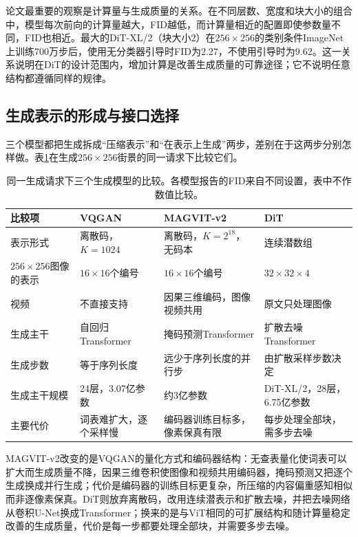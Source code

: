 论文最重要的观察是计算量与生成质量的关系。在不同层数、宽度和块大小的组合中，模型每次前向的计算量越大，FID越低，而计算量相近的配置即使参数量不同，FID也相近。最大的DiT-XL/2（块大小2）在$256\times256$的类别条件ImageNet上训练700万步后，使用无分类器引导时FID为2.27，不使用引导时为9.62。这一关系说明在DiT的设计范围内，增加计算是改善生成质量的可靠途径；它不说明任意结构都遵循同样的规律。

\subsection{生成表示的形成与接口选择}
\label{sec:vision-ivm-generation-interface}

三个模型都把生成拆成“压缩表示”和“在表示上生成”两步，差别在于这两步分别怎样做。表\ref{tab:vision-ivm-generation-models}在生成$256\times256$街景的同一请求下比较它们。

\begin{table}[htbp]
  \centering
  \small
  \begin{tabularx}{\linewidth}{@{}p{16mm}XXX@{}}
    \toprule
    比较项 & VQGAN & MAGVIT-v2 & DiT\\
    \midrule
    表示形式 & 离散码，$K=1024$ & 离散码，$K=2^{18}$，无码本 & 连续潜数组\\
    $256\times256$图像的表示 & $16\times16$个编号 & $16\times16$个编号 & $32\times32\times4$\\
    视频 & 不直接支持 & 因果三维编码，图像视频共用 & 原文只处理图像\\
    生成主干 & 自回归Transformer & 掩码预测Transformer & 扩散去噪Transformer\\
    生成步数 & 等于序列长度 & 远少于序列长度的并行步 & 由扩散采样步数决定\\
    生成主干规模 & 24层，3.07亿参数 & 约3亿参数 & DiT-XL/2，28层，6.75亿参数\\
    主要代价 & 词表难扩大，逐个采样慢 & 编码器训练目标多，像素保真有限 & 每步处理全部块，需多步去噪\\
    \bottomrule
  \end{tabularx}
  \caption{同一生成请求下三个生成模型的比较。各模型报告的FID来自不同设置，表中不作数值比较。}
  \label{tab:vision-ivm-generation-models}
\end{table}
\FloatBarrier

MAGVIT-v2改变的是VQGAN的量化方式和编码器结构：无查表量化使词表可以扩大而生成质量不降，因果三维卷积使图像和视频共用编码器，掩码预测又把逐个生成换成并行生成；代价是编码器的训练目标更复杂，所压缩的内容偏重感知相似而非逐像素保真。DiT则放弃离散码，改用连续潜表示和扩散去噪，并把去噪网络从卷积U-Net换成Transformer；换来的是与ViT相同的可扩展结构和随计算量稳定改善的生成质量，代价是每一步都要处理全部块，并需要多步去噪。

